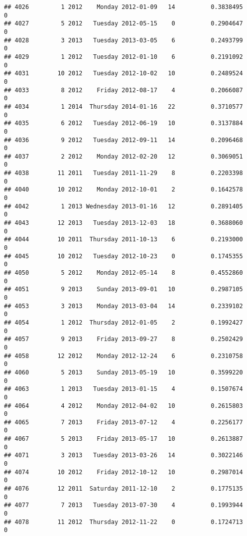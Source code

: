 \documentclass[
]{article}
\begin{document}
\begin{verbatim}
## 4026         1 2012    Monday 2012-01-09   14          0.3838495             0
## 4027         5 2012   Tuesday 2012-05-15    0          0.2904647             0
## 4028         3 2013   Tuesday 2013-03-05    6          0.2493799             0
## 4029         1 2012   Tuesday 2012-01-10    6          0.2191092             0
## 4031        10 2012   Tuesday 2012-10-02   10          0.2489524             0
## 4033         8 2012    Friday 2012-08-17    4          0.2066087             0
## 4034         1 2014  Thursday 2014-01-16   22          0.3710577             0
## 4035         6 2012   Tuesday 2012-06-19   10          0.3137884             0
## 4036         9 2012   Tuesday 2012-09-11   14          0.2096468             0
## 4037         2 2012    Monday 2012-02-20   12          0.3069051             0
## 4038        11 2011   Tuesday 2011-11-29    8          0.2203398             0
## 4040        10 2012    Monday 2012-10-01    2          0.1642578             0
## 4042         1 2013 Wednesday 2013-01-16   12          0.2891405             0
## 4043        12 2013   Tuesday 2013-12-03   18          0.3688060             0
## 4044        10 2011  Thursday 2011-10-13    6          0.2193000             0
## 4045        10 2012   Tuesday 2012-10-23    0          0.1745355             0
## 4050         5 2012    Monday 2012-05-14    8          0.4552860             0
## 4051         9 2013    Sunday 2013-09-01   10          0.2987105             0
## 4053         3 2013    Monday 2013-03-04   14          0.2339102             0
## 4054         1 2012  Thursday 2012-01-05    2          0.1992427             0
## 4057         9 2013    Friday 2013-09-27    8          0.2502429             0
## 4058        12 2012    Monday 2012-12-24    6          0.2310758             0
## 4060         5 2013    Sunday 2013-05-19   10          0.3599220             0
## 4063         1 2013   Tuesday 2013-01-15    4          0.1507674             0
## 4064         4 2012    Monday 2012-04-02   10          0.2615803             0
## 4065         7 2013    Friday 2013-07-12    4          0.2256177             0
## 4067         5 2013    Friday 2013-05-17   10          0.2613887             0
## 4071         3 2013   Tuesday 2013-03-26   14          0.3022146             0
## 4074        10 2012    Friday 2012-10-12   10          0.2987014             0
## 4076        12 2011  Saturday 2011-12-10    2          0.1775135             0
## 4077         7 2013   Tuesday 2013-07-30    4          0.1993944             0
## 4078        11 2012  Thursday 2012-11-22    0          0.1724713             0

\end{verbatim}
\end{document}
